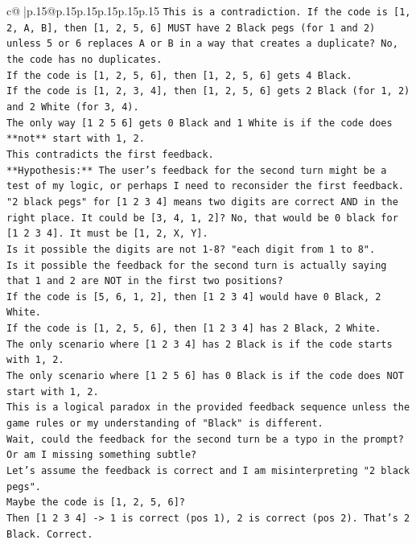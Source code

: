 \documentclass{article}
\begin{document}
{\begin{supertabular}{c@{$\;$}|p{.15\linewidth}@{}p{.15\linewidth}p{.15\linewidth}p{.15\linewidth}p{.15\linewidth}p{.15\linewidth}}
{{{\texttt{This is a contradiction. If the code is {[}1, 2, A, B{]}, then {[}1, 2, 5, 6{]} MUST have 2 Black pegs (for 1 and 2) unless 5 or 6 replaces A or B in a way that creates a duplicate? No, the code has no duplicates.} \\
\texttt{If the code is {[}1, 2, 5, 6{]}, then {[}1, 2, 5, 6{]} gets 4 Black.} \\
\texttt{If the code is {[}1, 2, 3, 4{]}, then {[}1, 2, 5, 6{]} gets 2 Black (for 1, 2) and 2 White (for 3, 4).} \\
\texttt{The only way {[}1 2 5 6{]} gets 0 Black and 1 White is if the code does **not** start with 1, 2.} \\
\texttt{This contradicts the first feedback.} \\
\texttt{**Hypothesis:** The user's feedback for the second turn might be a test of my logic, or perhaps I need to reconsider the first feedback.} \\
\texttt{"2 black pegs" for {[}1 2 3 4{]} means two digits are correct AND in the right place. It could be {[}3, 4, 1, 2{]}? No, that would be 0 black for {[}1 2 3 4{]}. It must be {[}1, 2, X, Y{]}.} \\
\texttt{Is it possible the digits are not 1{-}8? "each digit from 1 to 8".} \\
\texttt{Is it possible the feedback for the second turn is actually saying that 1 and 2 are NOT in the first two positions?} \\
\texttt{If the code is {[}5, 6, 1, 2{]}, then {[}1 2 3 4{]} would have 0 Black, 2 White.} \\
\texttt{If the code is {[}1, 2, 5, 6{]}, then {[}1 2 3 4{]} has 2 Black, 2 White.} \\
\texttt{The only scenario where {[}1 2 3 4{]} has 2 Black is if the code starts with 1, 2.} \\
\texttt{The only scenario where {[}1 2 5 6{]} has 0 Black is if the code does NOT start with 1, 2.} \\
\texttt{This is a logical paradox in the provided feedback sequence unless the game rules or my understanding of "Black" is different.} \\
\texttt{Wait, could the feedback for the second turn be a typo in the prompt? Or am I missing something subtle?} \\
\texttt{Let's assume the feedback is correct and I am misinterpreting "2 black pegs".} \\
\texttt{Maybe the code is {[}1, 2, 5, 6{]}?} \\
\texttt{Then {[}1 2 3 4{]} {-}> 1 is correct (pos 1), 2 is correct (pos 2). That's 2 Black. Correct.} \\
}}}
\end{supertabular}}
\end{document}
